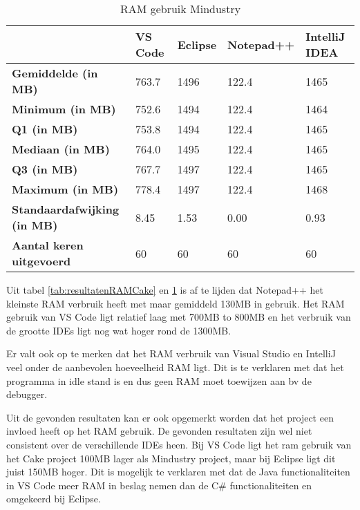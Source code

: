 \begin{table}[h]
	\centering
	\begin{tabular}{ l l l l l }
		\hline
		                                    & \textbf{VS Code} & \textbf{Eclipse} & \textbf{Notepad++} & \textbf{IntelliJ IDEA} \\
		\hline
		\textbf{Gemiddelde (in MB)}         & 763.7            & 1496             & 122.4              & 1465                   \\[1ex]

		\textbf{Minimum (in MB) }           & 752.6            & 1494             & 122.4              & 1464                   \\
		\textbf{Q1 (in MB)}                 & 753.8            & 1494             & 122.4              & 1465                   \\
		\textbf{Mediaan (in MB)}            & 764.0            & 1495             & 122.4              & 1465                   \\
		\textbf{Q3 (in MB)}                 & 767.7            & 1497             & 122.4              & 1465                   \\
		\textbf{Maximum (in MB)}            & 778.4            & 1497             & 122.4              & 1468                   \\[1ex]

		\textbf{Standaardafwijking (in MB)} & 8.45             & 1.53             & 0.00               & 0.93                   \\
		\textbf{Aantal keren uitgevoerd}    & 60               & 60               & 60                 & 60                     \\
		\hline
	\end{tabular}
	\caption{RAM gebruik Mindustry}
	\label{tab:resultatenRAMMindustry}
\end{table}

Uit tabel \ref{tab:resultatenRAMCake} en \ref{tab:resultatenRAMMindustry} is af te lijden dat Notepad++ het kleinste RAM verbruik heeft met maar gemiddeld 130MB in gebruik. Het RAM gebruik van VS Code ligt relatief laag met 700MB to 800MB en het verbruik van de grootte IDEs ligt nog wat hoger rond de 1300MB.

Er valt ook op te merken dat het RAM verbruik van Visual Studio en IntelliJ veel onder de aanbevolen hoeveelheid RAM ligt. Dit is te verklaren met dat het programma in idle stand is en dus geen RAM moet toewijzen aan bv de debugger. 

Uit de gevonden resultaten kan er ook opgemerkt worden dat het project een invloed heeft op het RAM gebruik. De gevonden resultaten zijn wel niet consistent over de verschillende IDEs heen. Bij VS Code ligt het ram gebruik van het Cake project 100MB lager als Mindustry project, maar bij Eclipse ligt dit juist 150MB hoger. Dit is mogelijk te verklaren met dat de Java functionaliteiten in VS Code meer RAM in beslag nemen dan de C\# functionaliteiten en omgekeerd bij Eclipse.
